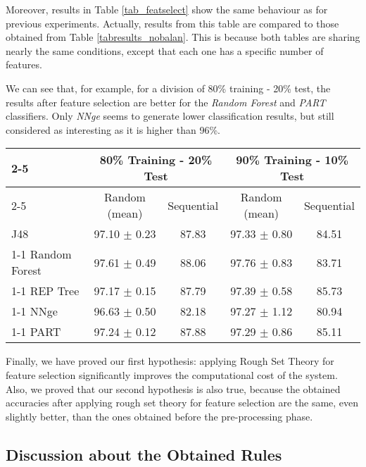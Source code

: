 \documentclass{llncs}
\begin{document}
Moreover, results in Table \ref{tab_featselect} show the same behaviour as for previous experiments. Actually, results from this table are compared to those obtained from Table \ref{tabresults_nobalan}. This is because both tables are sharing nearly the same conditions, except that each one has a specific number of features. 

We can see that, for example, for a division of 80\% training - 20\% test, the results after feature selection are better for the \textit{Random Forest} and \textit{PART} classifiers. Only \textit{NNge} seems to generate lower classification results, but still considered as interesting as it is higher than 96\%.  

\begin{table*}[htpb]
\centering
 \caption{\label{tab_featselect} Percentage of correctly classified patterns for the unbalanced dataset with 9 features.}
{\small
\begin{tabular}{|l|c|c|c|c|}
\cline{2-5}
\multicolumn{1}{l|}{} & \multicolumn{2}{c|}{80\% Training - 20\% Test} & \multicolumn{2}{c|}{90\% Training - 10\% Test} \\
\cline{2-5}
\multicolumn{1}{l|}{} & Random (mean) & Sequential & Random (mean) & Sequential \\
\hline
J48 & 97.10 $\pm$ 0.23 & 87.83 & 97.33 $\pm$ 0.80 & 84.51 \\
\cline{1-1}
Random Forest & 97.61 $\pm$ 0.49 & 88.06 & 97.76 $\pm$ 0.83 & 83.71 \\
\cline{1-1}
REP Tree & 97.17 $\pm$ 0.15 & 87.79 & 97.39 $\pm$ 0.58 & 85.73 \\
\cline{1-1}
NNge & 96.63 $\pm$ 0.50 & 82.18 & 97.27 $\pm$ 1.12 & 80.94 \\
\cline{1-1}
PART & 97.24 $\pm$ 0.12 & 87.88 & 97.29 $\pm$ 0.86 & 85.11 \\
\hline
\end{tabular}
}
\end{table*}

Finally, we have proved our first hypothesis: applying Rough Set Theory for feature selection significantly improves the computational cost of the system. Also, we proved that our second hypothesis is also true, because the obtained accuracies after applying rough set theory for feature selection are the same, even slightly better, than the ones obtained before the pre-processing phase.

\subsection{Discussion about the Obtained Rules}
\label{subsec:rulesdiscussion}
\end{document}
